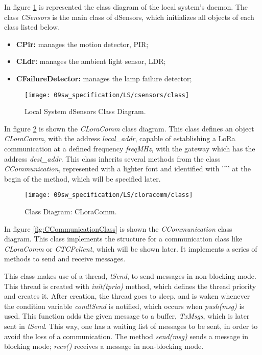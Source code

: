 \clearpage
In figure \ref{fig:csensors} is represented the class diagram of the local system's daemon. The class \textit{CSensors} is the main class of dSensors, which initializes all objects of each class listed below.

\begin{itemize}
	\item \textbf{CPir:} manages the motion detector, PIR;
	\item \textbf{CLdr:} manages the ambient light sensor, LDR;
	\item \textbf{CFailureDetector:} manages the lamp failure detector;
\end{itemize}

\begin{figure}[H]
	\centering
	\texttt{[image: 09sw\_specification/LS/csensors/class]}
	\caption{Local System dSensors Class Diagram.}
	\label{fig:csensors}
\end{figure}

\clearpage
{}

In figure \ref{fig:LoraCommClass} is shown the \textit{CLoraComm} class diagram. This class defines an object \textit{CLoraComm}, with the address \textit{local\_addr}, capable of establishing a LoRa communication at a defined frequency \textit{freqMHz}, with the gateway which has the address \textit{dest\_addr}. This class inherits several methods from the class \textit{CCommunication}, represented with a lighter font and identified with '\^{}' at the begin of the method, which will be specified later.

\begin{figure}[H]
	\centering
	\texttt{[image: 09sw\_specification/LS/cloracomm/class]}
	\caption{Class Diagram: CLoraComm.}
	\label{fig:LoraCommClass}
\end{figure}

\clearpage
{}

In figure \ref{fig:CCommunicationClass} is shown the \textit{CCommunication} class diagram. This class implements the structure for a communication class like \textit{CLoraComm} or \textit{CTCPclient}, which will be shown later. It implements a series of methods to send and receive messages. 

This class makes use of a thread, \textit{tSend}, to send messages in non-blocking mode. This thread is created with \textit{init(tprio)} method, which defines the thread priority and creates it. After creation, the thread goes to sleep, and is waken whenever the condition variable \textit{condtSend} is notified, which occurs when \textit{push(msg)} is used. This function adds the given message to a buffer, \textit{TxMsgs}, which is later sent in \textit{tSend}. This way, one has a waiting list of messages to be sent, in order to avoid the loss of a communication. The method \textit{send(msg)} sends a message in blocking mode; \textit{recv()} receives a message in non-blocking mode.

